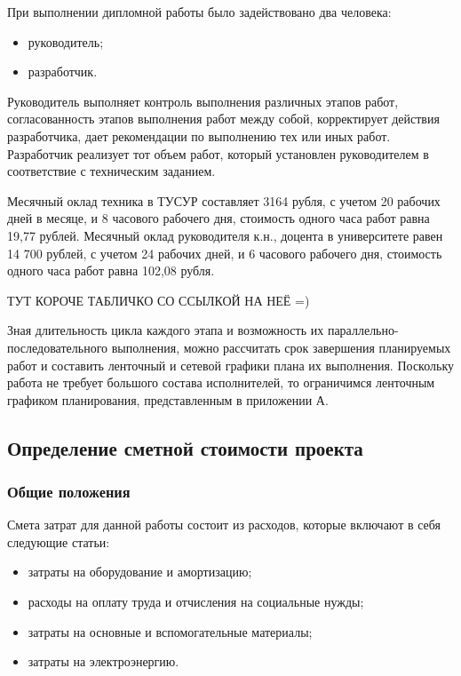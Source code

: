 При выполнении дипломной работы было задействовано два человека:

\begin{itemize}
 \item руководитель;
 \item разработчик.
\end{itemize}

Руководитель выполняет контроль выполнения различных этапов работ, согласованность этапов выполнения работ между собой, корректирует действия разработчика, дает рекомендации по выполнению тех или иных работ. Разработчик реализует тот объем работ, который установлен руководителем в соответствие с техническим заданием.

Месячный оклад техника в ТУСУР составляет 3164 рубля, с учетом 20 рабочих дней в месяце, и 8 часового рабочего дня, стоимость одного часа работ равна 19,77 рублей. Месячный оклад руководителя к.н., доцента в университете равен 14 700 рублей, с учетом 24 рабочих дней, и 6 часового рабочего дня, стоимость одного часа работ равна 102,08 рубля.

ТУТ КОРОЧЕ ТАБЛИЧКО СО ССЫЛКОЙ НА НЕЁ =) %

Зная длительность цикла каждого этапа и возможность их параллельно-последовательного выполнения, можно рассчитать срок завершения планируемых работ и составить ленточный и сетевой графики плана их выполнения. Поскольку работа не требует большого состава исполнителей, то ограничимся ленточным графиком планирования, представленным в приложении А.

\subsection{Определение сметной стоимости проекта}

\subsubsection{Общие положения}

Смета затрат для данной работы состоит из расходов, которые включают в себя следующие статьи:

\begin{itemize}
 \item затраты на оборудование и амортизацию;
 \item расходы на оплату труда и отчисления на социальные нужды;
 \item затраты на основные и вспомогательные материалы;
 \item затраты на электроэнергию.
\end{itemize}

